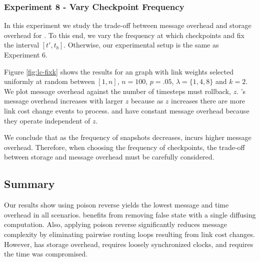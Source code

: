 \subsubsection{Experiment 8 - Vary Checkpoint Frequency}

In this experiment we study the trade-off between message overhead and storage overhead for \cprs. To this end, we vary the frequency at which \cpr checkpoints and fix 
the interval $[t',t_b]$. Otherwise, our experimental setup is the same as Experiment 6.

Figure \ref{fig:lc-fixk} shows the results for an \er graph with link weights selected uniformly at random between $[1,n]$,
$n=100$, $p=.05$, $\lambda=\{1,4,8\}$ and $k=2$. We plot message overhead against the number of timesteps \cpr must rollback, $z$. \cprs's message overhead increases with larger $z$ 
because as $z$ increases there are more link cost change events to process. \second and \purge have constant message overhead because they operate independent of $z$.

We conclude that as the frequency of \cpr snapshots decreases, \cpr incurs higher message overhead.  Therefore, when choosing the frequency of checkpoints,
the trade-off between storage and message overhead must be carefully considered. 



\begin{figure*}[t]
\centering
{}
\caption{Experiment 8: message overhead for $p=0.05$ \er with link weights selected uniformly random with different $\lambda$ values. $z$ refers to the number of timesteps \cpr must 
rollback. Note the y-axis have different scales.}
\label{fig:lc-fixk}
\end{figure*} 


\subsection{Summary}
\label{subsec:discuss}


Our results show \cpr using poison reverse yields the lowest message and time overhead in all scenarios. \cpr benefits from removing false state with a single
diffusing computation. Also, applying poison reverse significantly reduces \cpr message complexity by eliminating pairwise routing loops resulting from
link cost changes. However, \cpr has storage overhead, requires loosely synchronized clocks, and requires the time \bad was compromised.

